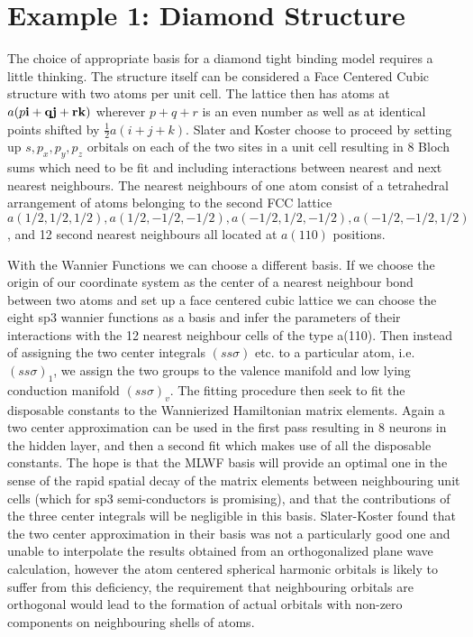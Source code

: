 \section{Example 1: Diamond Structure}
The choice of appropriate basis for a diamond tight binding model requires a little thinking.
The structure itself can be considered a Face Centered Cubic structure with two atoms per unit cell.
The lattice then has atoms at $a(p\bf{i} + q\bf{j} + r\bf{k})$ wherever $p+q+r$ is an even number
as well as at identical points shifted by $\frac{1}{2}a(i+j+k)$. Slater and Koster choose to proceed
by setting up $s,p_{x},p_{y},p_{z}$ orbitals on each of the two sites in a unit cell resulting in 8 
Bloch sums which need to be fit and including interactions between nearest and next nearest neighbours.
The nearest neighbours of one atom consist of a tetrahedral arrangement of atoms belonging to the 
second FCC lattice $a(1/2,1/2,1/2), a(1/2,-1/2,-1/2), a(-1/2,1/2,-1/2), a(-1/2,-1/2,1/2)$,
and 12 second nearest neighbours all located at $a(110)$ positions.

With the Wannier Functions we can choose a different basis. If we choose the origin of our coordinate
system as the center of a nearest neighbour bond between two atoms and set up a face centered cubic lattice
we can choose the eight sp3 wannier functions as a basis and infer the parameters
of their interactions with the 12 nearest neighbour cells of the type a(110). Then instead
of assigning the two center integrals $(ss\sigma)$ etc. to a particular atom, 
i.e. $(ss\sigma)_1$, we assign the two groups to the valence manifold and low lying conduction manifold 
$(ss\sigma)_{v}$. The fitting procedure then seek to fit the disposable constants to the 
Wannierized Hamiltonian matrix elements. Again a two center approximation can be used in the first pass
resulting in 8 neurons in the hidden layer, and then a second fit which makes use of 
all the disposable constants. The hope is that the MLWF basis will provide an optimal one in the
sense of the rapid spatial decay of the matrix elements between neighbouring unit cells 
(which for sp3 semi-conductors is promising), and that the contributions of the three center
integrals will be negligible in this basis. Slater-Koster found that the two center approximation in their
basis was not a particularly good one and unable to interpolate the results obtained
from an orthogonalized plane wave calculation, however the atom centered spherical harmonic orbitals is likely 
to suffer from this deficiency, the requirement that neighbouring orbitals are orthogonal would lead to 
the formation of actual orbitals with non-zero components on neighbouring shells of atoms. 

